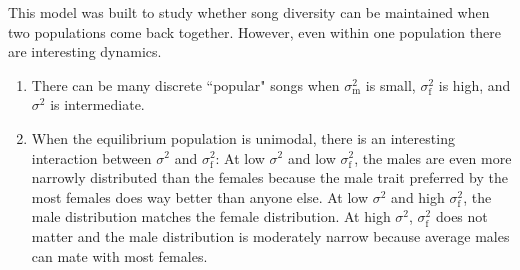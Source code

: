 \documentclass{article}
\begin{document}
This model was built to study whether song diversity can be maintained when two populations come back together. However, even within one population there are interesting dynamics.
\begin{enumerate}
\item There can be many discrete ``popular" songs when $\sigma_\text{m}^2$  is small, $\sigma_\text{f}^2$ is high, and $\sigma^2$ is intermediate.
\item When the equilibrium population is unimodal, there is an interesting interaction between $\sigma^2$ and $\sigma_\text{f}^2$: At low $\sigma^2$ and low $\sigma_\text{f}^2$, the males are even more narrowly distributed than the females because the male trait preferred by the most females does way better than anyone else. At low $\sigma^2$ and high $\sigma_\text{f}^2$, the male distribution matches the female distribution. At high $\sigma^2$, $\sigma_\text{f}^2$ does not matter and the male distribution is moderately narrow because average males can mate with most females. 
\end{enumerate}



\end{document}
